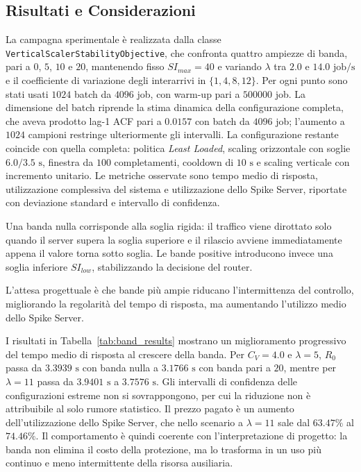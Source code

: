﻿\documentclass[a4paper,12pt]{article}
\begin{document}
\subsection{Risultati e Considerazioni}
La campagna sperimentale è realizzata dalla classe \texttt{VerticalScalerStabilityObjective}, che confronta quattro ampiezze di banda, pari a $0$, $5$, $10$ e $20$, mantenendo fisso $SI_{max}=40$ e variando $\lambda$ tra $2.0$ e $14.0\text{ job/s}$ e il coefficiente di variazione degli interarrivi in $\{1,4,8,12\}$. Per ogni punto sono stati usati $1024$ batch da $4096$ job, con warm-up pari a $500000$ job. La dimensione del batch riprende la stima dinamica della configurazione completa, che aveva prodotto lag-1 ACF pari a $0.0157$ con batch da $4096$ job; l'aumento a $1024$ campioni restringe ulteriormente gli intervalli. La configurazione restante coincide con quella completa: politica \textit{Least Loaded}, scaling orizzontale con soglie $6.0/3.5\text{ s}$, finestra da $100$ completamenti, cooldown di $10\text{ s}$ e scaling verticale con incremento unitario. Le metriche osservate sono tempo medio di risposta, utilizzazione complessiva del sistema e utilizzazione dello Spike Server, riportate con deviazione standard e intervallo di confidenza.

Una banda nulla corrisponde alla soglia rigida: il traffico viene dirottato solo quando il server supera la soglia superiore e il rilascio avviene immediatamente appena il valore torna sotto soglia. Le bande positive introducono invece una soglia inferiore $SI_{low}$, stabilizzando la decisione del router.

L'attesa progettuale è che bande più ampie riducano l'intermittenza del controllo, migliorando la regolarità del tempo di risposta, ma aumentando l'utilizzo medio dello Spike Server.

I risultati in Tabella~\ref{tab:band_results} mostrano un miglioramento progressivo del tempo medio di risposta al crescere della banda. Per $C_V=4.0$ e $\lambda=5$, $R_0$ passa da $3.3939\text{ s}$ con banda nulla a $3.1766\text{ s}$ con banda pari a $20$, mentre per $\lambda=11$ passa da $3.9401\text{ s}$ a $3.7576\text{ s}$. Gli intervalli di confidenza delle configurazioni estreme non si sovrappongono, per cui la riduzione non è attribuibile al solo rumore statistico. Il prezzo pagato è un aumento dell'utilizzazione dello Spike Server, che nello scenario a $\lambda=11$ sale dal $63.47\%$ al $74.46\%$. Il comportamento è quindi coerente con l'interpretazione di progetto: la banda non elimina il costo della protezione, ma lo trasforma in un uso più continuo e meno intermittente della risorsa ausiliaria.
\end{document}
